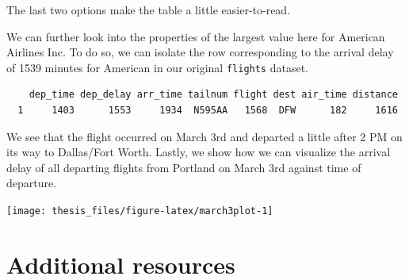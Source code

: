 \documentclass[12pt,twoside]{reedthesis}
\begin{document}
  The last two options make the table a little easier-to-read.
  
  We can further look into the properties of the largest value here for
  American Airlines Inc. To do so, we can isolate the row corresponding to
  the arrival delay of 1539 minutes for American in our original
  \texttt{flights} dataset.
  
  \begin{Shaded}
  \end{Shaded}
  
  \begin{verbatim}
    dep_time dep_delay arr_time tailnum flight dest air_time distance
  1     1403      1553     1934  N595AA   1568  DFW      182     1616
  \end{verbatim}
  
  We see that the flight occurred on March 3rd and departed a little after
  2 PM on its way to Dallas/Fort Worth. Lastly, we show how we can
  visualize the arrival delay of all departing flights from Portland on
  March 3rd against time of departure.
  
  \begin{Shaded}
  \end{Shaded}
  
  \begin{center}\texttt{[image: thesis\_files/figure-latex/march3plot-1]} \end{center}
  
  \section{Additional resources}\label{additional-resources}
  
\end{document}
